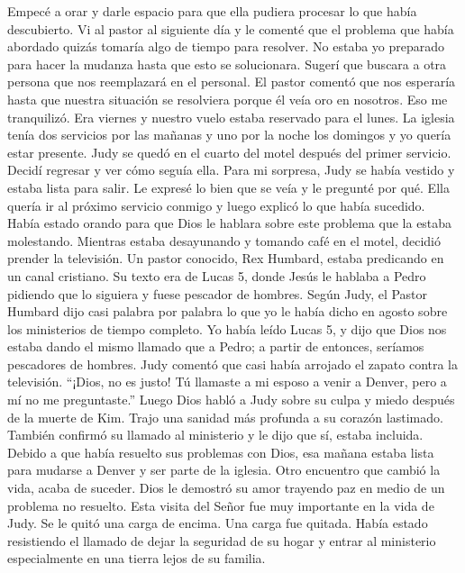 \documentclass[twoside, 12pt]{book}
\begin{document}
Empecé a orar y darle espacio para que ella pudiera procesar lo que había descubierto. Vi al pastor al siguiente día y le comenté que el problema que había abordado quizás tomaría algo de tiempo para resolver. No estaba yo preparado para hacer la mudanza hasta que esto se solucionara. Sugerí que buscara a otra persona que nos reemplazará en el personal. El pastor comentó que nos esperaría hasta que nuestra situación se resolviera porque él veía oro en nosotros. Eso me tranquilizó. Era viernes y nuestro vuelo estaba reservado para el lunes. 
La iglesia tenía dos servicios por las mañanas y uno por la noche los domingos y yo quería estar presente. Judy se quedó en el cuarto del motel después del primer servicio. Decidí regresar y ver cómo seguía ella. Para mi sorpresa, Judy se había vestido y estaba lista para salir. Le expresé lo bien que se veía y le pregunté por qué. Ella quería ir al próximo servicio conmigo y luego explicó lo que había sucedido. Había estado orando para que Dios le hablara sobre este problema que la estaba molestando. Mientras estaba desayunando y tomando café en el motel, decidió prender la televisión. Un pastor conocido, Rex Humbard, estaba predicando en un canal cristiano. Su texto era de Lucas 5, donde Jesús le hablaba a Pedro pidiendo que lo siguiera y fuese pescador de hombres. Según Judy, el Pastor Humbard dijo casi palabra por palabra lo que yo le había dicho en agosto sobre los ministerios de tiempo completo. Yo había leído Lucas 5, y dijo que Dios nos estaba dando el mismo llamado que a Pedro; a partir de entonces, seríamos pescadores de hombres. Judy comentó que casi había arrojado el zapato contra la televisión. “¡Dios, no es justo! Tú llamaste a mi esposo a venir a Denver, pero a mí no me preguntaste.” Luego Dios habló a Judy sobre su culpa y miedo después de la muerte de Kim. Trajo una sanidad más profunda a su corazón lastimado. También confirmó su llamado al ministerio y le dijo que sí, estaba incluida. Debido a que había resuelto sus problemas con Dios, esa mañana estaba lista para mudarse a Denver y ser parte de la iglesia. Otro encuentro que cambió la vida, acaba de suceder. Dios le demostró su amor trayendo paz en medio de un problema no resuelto. Esta visita del Señor fue muy importante en la vida de Judy. Se le quitó una carga de encima. Una carga fue quitada. Había estado resistiendo el llamado de dejar la seguridad de su hogar y entrar al ministerio especialmente en una tierra lejos de su familia.\\
\end{document}

